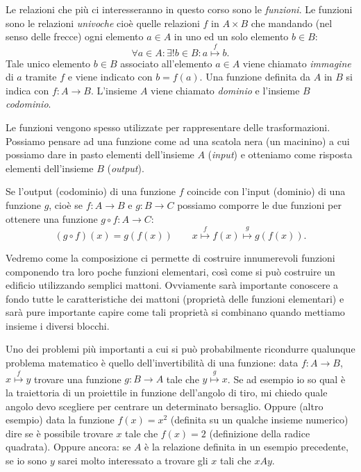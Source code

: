 \documentclass[italian,a4paper,hidelinks,headinclude]{scrartcl}
\newcommand{\myemph}[1]{\emph{#1}\marginpar{#1}}
\begin{document}
Le relazioni che più ci interesseranno in questo corso sono le \myemph{funzioni}.
Le funzioni sono le relazioni \emph{univoche} cioè quelle relazioni $f$ in
$A\times B$ che
mandando (nel senso delle frecce) ogni elemento $a\in A$ in uno
ed un solo elemento
$b\in B$:
\[
\forall a\in A\colon \exists ! b\in B\colon a\stackrel{f}\mapsto b.
\]
Tale unico elemento $b\in B$ associato all'elemento $a\in A$ viene chiamato
\emph{immagine} di $a$ tramite $f$ e viene indicato con $b=f(a)$.
Una funzione definita da $A$ in $B$ si indica con $f\colon A \to B$. L'insieme
$A$ viene chiamato \myemph{dominio} e l'insieme $B$ \myemph{codominio}.

Le funzioni vengono spesso utilizzate per rappresentare delle trasformazioni.
Possiamo pensare ad una funzione come ad una scatola nera (un macinino)
a cui possiamo dare in pasto elementi dell'insieme $A$ (\emph{input})
e otteniamo come risposta elementi dell'insieme $B$ (\emph{output}).

Se l'output (codominio) di una funzione $f$
coincide con l'input (dominio) di una funzione $g$,
cioè se $f\colon A \to B$ e $g\colon B \to C$
possiamo comporre
le due funzioni per ottenere una funzione
$g\circ f \colon A \to C$:
\[
(g\circ f)(x) = g(f(x))\qquad
x \stackrel f \mapsto f(x) \stackrel g \mapsto g(f(x)).
\]

Vedremo come la composizione ci permette di costruire innumerevoli funzioni
componendo tra loro poche funzioni elementari, così come si può costruire un edificio
utilizzando semplici mattoni.
Ovviamente sarà importante conoscere a fondo
tutte le caratteristiche dei mattoni (proprietà delle funzioni elementari)
e sarà pure importante capire come tali proprietà si combinano quando mettiamo
insieme i diversi blocchi.

Uno dei problemi più importanti a
cui si può probabilmente ricondurre qualunque problema
matematico è quello dell'invertibilità di una funzione: data $f\colon A\to B$,
$x\stackrel f \mapsto y$ trovare una funzione $g\colon B\to A$ tale che
$y \stackrel g\mapsto x$. Se ad esempio io so qual è la traiettoria di
un proiettile in funzione dell'angolo di tiro, mi chiedo quale angolo devo
scegliere per centrare un determinato bersaglio.
Oppure (altro esempio) data la funzione $f(x) = x^2$ (definita su un qualche insieme
numerico) dire se è possibile trovare $x$ tale che $f(x) = 2$
(definizione della radice quadrata).
Oppure ancora: se $A$ è la relazione definita in un esempio precedente,
se io sono $y$ sarei molto interessato a trovare gli $x$ tali che $x A y$.
\end{document}
